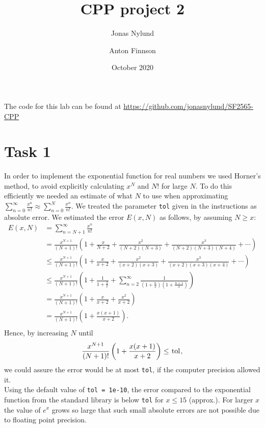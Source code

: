 \documentclass[12pt]{article}
\title{CPP project 2}
\author{Jonas Nylund \and Anton Finnson}
\date{October 2020}
\begin{document}
\maketitle

The code for this lab can be found at \href{https://github.com/jonasnylund/SF2565-CPP}{https://github.com/jonasnylund/SF2565-CPP}

% 

\section{Task 1}
In order to implement the exponential function for real numbers we used Horner's method, to avoid explicitly calculating $x^N$ and $N!$ for large $N$. To do this efficiently we needed an estimate of what $N$ to use when approximating $\sum_{n=0}^\infty \frac{x^n}{n!} \approx \sum_{n=0}^N \frac{x^n}{n!}.$ We treated the parameter \lstinline{tol} given in the instructions as absolute error. We estimated the error $E(x, N)$ as follows, by assuming $N \geq x$:
\begin{align*}
    E(x, N) &= \sum_{n = N+1}^\infty \frac{x^n}{n!}\\ &=\frac{x^{N+1}}{(N+1)!}\left(1 + \frac{x}{N+2} + \frac{x^2}{(N+2)(N+3)}
    + \frac{x^3}{(N+2)(N+3)(N+4)} + \cdots \right)\\
    &\leq \frac{x^{N+1}}{(N+1)!}\left(1 + \frac{x}{x+2} + \frac{x^2}{(x+2)(x+3)}
    + \frac{x^3}{(x+2)(x+3)(x+4)} + \cdots\right)\\
    &\leq \frac{x^{N+1}}{(N+1)!}\left(1 + \frac{1}{1 + \frac{2}{x}} + \sum_{n = 2}^\infty \frac{1}{(1+\frac{n}{x})(1 + \frac{n+1}{x})} \right)\\
    &= \frac{x^{N+1}}{(N+1)!}\left(1 + \frac{x}{x + 2} + \frac{x^2}{x+2}\right)\\
    &= \frac{x^{N+1}}{(N+1)!}\left(1 + \frac{x(x+1)}{x + 2}\right).\\
\end{align*}
Hence, by increasing $N$ until 
\begin{align*}
    \frac{x^{N+1}}{(N+1)!}\left(1 + \frac{x(x+1)}{x + 2}\right) \leq \lstinline{tol},
\end{align*}
we could assure the error would be at most \lstinline{tol}, if the computer precision allowed it.\\

Using the default value of \lstinline{tol = 1e-10}, the error compared to the exponential function from the standard library is below \lstinline{tol} for $x \leq 15$  (approx.). For larger $x$ the value of $e^x$ grows so large that such small absolute errors are not possible due to floating point precision.
\end{document}
